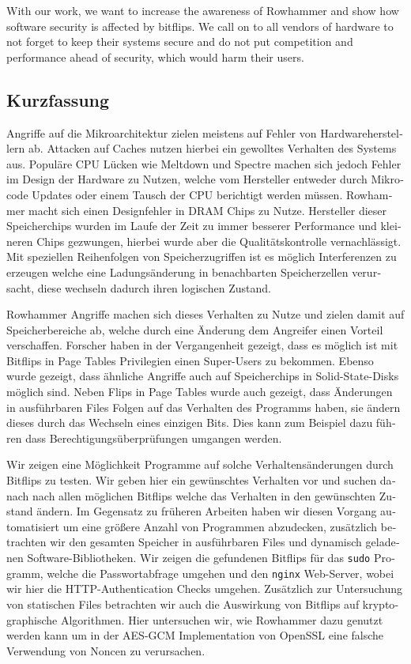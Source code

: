With our work, we want to increase the awareness of Rowhammer and show how
software security is affected by bitflips. We call on to all vendors of hardware
to not forget to keep their systems secure and do not put competition and
performance ahead of security, which would harm their users.
\cleardoublepage
{}
{}
\begin{otherlanguage}{ngerman}
\chapter*{Kurzfassung}
\label{cha:kurzfassung}

Angriffe auf die Mikroarchitektur zielen meistens auf Fehler von
Hardwareherstellern ab. Attacken auf Caches nutzen hierbei ein gewolltes
Verhalten des Systems aus. Populäre CPU Lücken wie Meltdown und Spectre machen
sich jedoch Fehler im Design der Hardware zu Nutzen, welche vom Hersteller
entweder durch Mikrocode Updates oder einem Tausch der CPU berichtigt werden
müssen. Rowhammer macht sich einen Designfehler in DRAM Chips zu Nutze.
Hersteller dieser Speicherchips wurden im Laufe der Zeit zu immer besserer
Performance und kleineren Chips gezwungen, hierbei wurde aber die
Qualitätskontrolle vernachlässigt. Mit speziellen Reihenfolgen von
Speicherzugriffen ist es möglich Interferenzen zu erzeugen welche eine
Ladungsänderung in benachbarten Speicherzellen verursacht, diese wechseln
dadurch ihren logischen Zustand.

Rowhammer Angriffe machen sich dieses Verhalten zu Nutze und zielen damit auf
Speicherbereiche ab, welche durch eine Änderung dem Angreifer einen Vorteil
verschaffen. Forscher haben in der Vergangenheit gezeigt, dass es möglich ist
mit Bitflips in Page Tables Privilegien einen Super-Users zu bekommen. Ebenso
wurde gezeigt, dass ähnliche Angriffe auch auf Speicherchips in
Solid-State-Disks möglich sind. Neben Flips in Page Tables wurde auch gezeigt,
dass Änderungen in ausführbaren Files Folgen auf das Verhalten des Programms
haben, sie ändern dieses durch das Wechseln eines einzigen Bits. Dies kann zum
Beispiel dazu führen dass Berechtigungsüberprüfungen umgangen werden.

Wir zeigen eine Möglichkeit Programme auf solche Verhaltensänderungen durch
Bitflips zu testen. Wir geben hier ein gewünschtes Verhalten vor und suchen
danach nach allen möglichen Bitflips welche das Verhalten in den gewünschten
Zustand ändern. Im Gegensatz zu früheren Arbeiten haben wir diesen Vorgang
automatisiert um eine größere Anzahl von Programmen abzudecken, zusätzlich
betrachten wir den gesamten Speicher in ausführbaren Files und dynamisch
geladenen Software-Bibliotheken. Wir zeigen die gefundenen Bitflips für das
\texttt{sudo} Programm, welche die Passwortabfrage umgehen und den
\texttt{nginx} Web-Server, wobei wir hier die HTTP-Authentication Checks
umgehen. Zusätzlich zur Untersuchung von statischen Files betrachten wir auch
die Auswirkung von Bitflips auf kryptographische Algorithmen. Hier untersuchen
wir, wie Rowhammer dazu genutzt werden kann um in der AES-GCM Implementation von
OpenSSL eine falsche Verwendung von Noncen zu verursachen.


\end{otherlanguage}
